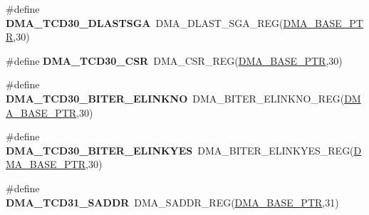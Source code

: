 \begin{DoxyCompactItemize}
\item 
\hypertarget{group___d_m_a___register___accessor___macros_ga6a9d905dea5cfd7110a5e2eae75ee73b}{}\#define {\bfseries D\+M\+A\+\_\+\+T\+C\+D30\+\_\+\+D\+L\+A\+S\+T\+S\+G\+A}~D\+M\+A\+\_\+\+D\+L\+A\+S\+T\+\_\+\+S\+G\+A\+\_\+\+R\+E\+G(\hyperlink{group___d_m_a___peripheral_ga6997fbc1b1973e9f27170217a3bd6f22}{D\+M\+A\+\_\+\+B\+A\+S\+E\+\_\+\+P\+T\+R},30)\label{group___d_m_a___register___accessor___macros_ga6a9d905dea5cfd7110a5e2eae75ee73b}

\item 
\hypertarget{group___d_m_a___register___accessor___macros_ga06c4945cad2e4695e6cf71c20f05af1e}{}\#define {\bfseries D\+M\+A\+\_\+\+T\+C\+D30\+\_\+\+C\+S\+R}~D\+M\+A\+\_\+\+C\+S\+R\+\_\+\+R\+E\+G(\hyperlink{group___d_m_a___peripheral_ga6997fbc1b1973e9f27170217a3bd6f22}{D\+M\+A\+\_\+\+B\+A\+S\+E\+\_\+\+P\+T\+R},30)\label{group___d_m_a___register___accessor___macros_ga06c4945cad2e4695e6cf71c20f05af1e}

\item 
\hypertarget{group___d_m_a___register___accessor___macros_gae21cd8ac7bcc9fcf578872e43e1579cc}{}\#define {\bfseries D\+M\+A\+\_\+\+T\+C\+D30\+\_\+\+B\+I\+T\+E\+R\+\_\+\+E\+L\+I\+N\+K\+N\+O}~D\+M\+A\+\_\+\+B\+I\+T\+E\+R\+\_\+\+E\+L\+I\+N\+K\+N\+O\+\_\+\+R\+E\+G(\hyperlink{group___d_m_a___peripheral_ga6997fbc1b1973e9f27170217a3bd6f22}{D\+M\+A\+\_\+\+B\+A\+S\+E\+\_\+\+P\+T\+R},30)\label{group___d_m_a___register___accessor___macros_gae21cd8ac7bcc9fcf578872e43e1579cc}

\item 
\hypertarget{group___d_m_a___register___accessor___macros_gab370894ff692b9900bfc2946fd1e4b8c}{}\#define {\bfseries D\+M\+A\+\_\+\+T\+C\+D30\+\_\+\+B\+I\+T\+E\+R\+\_\+\+E\+L\+I\+N\+K\+Y\+E\+S}~D\+M\+A\+\_\+\+B\+I\+T\+E\+R\+\_\+\+E\+L\+I\+N\+K\+Y\+E\+S\+\_\+\+R\+E\+G(\hyperlink{group___d_m_a___peripheral_ga6997fbc1b1973e9f27170217a3bd6f22}{D\+M\+A\+\_\+\+B\+A\+S\+E\+\_\+\+P\+T\+R},30)\label{group___d_m_a___register___accessor___macros_gab370894ff692b9900bfc2946fd1e4b8c}

\item 
\hypertarget{group___d_m_a___register___accessor___macros_gad82a43985c70ed187d287607602b0329}{}\#define {\bfseries D\+M\+A\+\_\+\+T\+C\+D31\+\_\+\+S\+A\+D\+D\+R}~D\+M\+A\+\_\+\+S\+A\+D\+D\+R\+\_\+\+R\+E\+G(\hyperlink{group___d_m_a___peripheral_ga6997fbc1b1973e9f27170217a3bd6f22}{D\+M\+A\+\_\+\+B\+A\+S\+E\+\_\+\+P\+T\+R},31)\label{group___d_m_a___register___accessor___macros_gad82a43985c70ed187d287607602b0329}


\end{DoxyCompactItemize}
